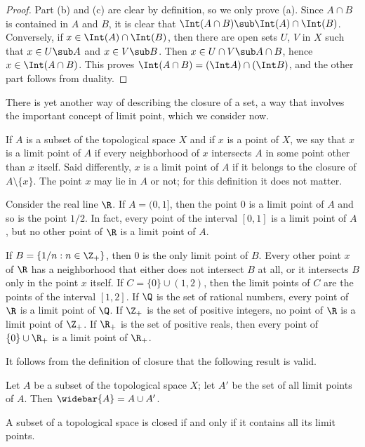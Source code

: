 \begin{proof}
Part (b) and (c) are clear by definition, so we only prove (a). Since $A\cap B$ is contained in $A$ and $B$, it is clear that $\Int(A\cap B)\sub\Int(A)\cap\Int(B)$. Conversely, if $x\in\Int(A)\cap\Int(B)$, then there are open sets $U$, $V$ in $X$ such that $x\in U\sub A$ and $x\in V\sub B$. Then $x\in U\cap V\sub A\cap B$, hence $x\in\Int(A\cap B)$. This proves $\Int(A\cap B)=(\Int A)\cap(\Int B)$, and the other part follows from duality.
\end{proof}
There is yet another way of describing the closure of a set, a way that involves the important concept of limit point, which we consider now.\par
If $A$ is a subset of the topological space $X$ and if $x$ is a point of $X$, we say that $x$ is a limit point of $A$ if every neighborhood of $x$ intersects $A$ in some point other than $x$ itself. Said differently, $x$ is a limit point of $A$ if it belongs to the closure of $A\setminus\{x\}$. The point $x$ may lie in $A$ or not; for this definition it does not matter.
\begin{example}
Consider the real line $\R$. If $A=(0,1]$, then the point $0$ is a limit point of $A$ and so is the point $1/2$. In fact, every point of the interval $[0,1]$ is a limit point of $A$, but no other point of $\R$ is a limit point of $A$.\par
If $B=\{1/n:n\in\Z_+\}$, then $0$ is the only limit point of $B$. Every other point $x$ of $\R$ has a neighborhood that either does not intersect $B$ at all, or it intersects $B$ only in the point $x$ itself. If $C=\{0\}\cup(1,2)$, then the limit points of $C$ are the points of the interval $[1,2]$. If $\Q$ is the set of rational numbers, every point of $\R$ is a limit point of $\Q$. If $\Z_+$ is the set of positive integers, no point of $\R$ is a limit point of $\Z_+$. If $\R_+$ is the set of positive reals, then every point of $\{0\}\cup\R_+$ is a limit point of $\R_+$.
\end{example}
It follows from the definition of closure that the following result is valid.
\begin{proposition}
Let $A$ be a subset of the topological space $X$; let $A'$ be the set of all limit points of $A$. Then $\widebar{A}=A\cup A'$.
\end{proposition}
\begin{corollary}
A subset of a topological space is closed if and only if it contains all its limit points.
\end{corollary}
